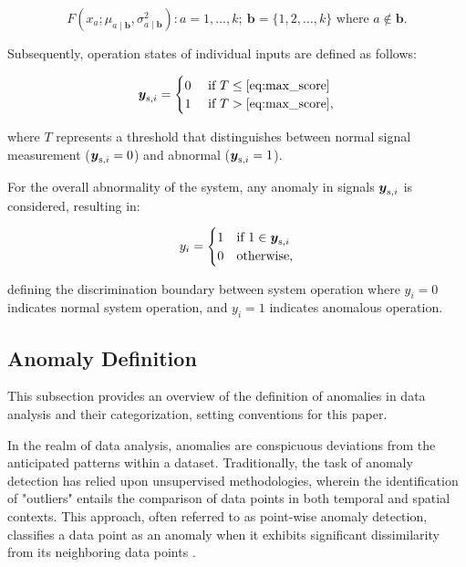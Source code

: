 
\begin{equation}
  {F(x_a; \mu_{a \mid \boldsymbol{b}}, \sigma_{a \mid \boldsymbol{b}}^2)}:a = 1,...,k;~ \boldsymbol{b} = \{1, 2, \ldots, k\} \text{ where }a \notin \boldsymbol{b} \text{.}\label{eq:max_score}
\end{equation}

Subsequently, operation states of individual inputs are defined as follows:

\begin{equation}
  \boldsymbol{y} _{\text{s}, i} =
  \begin{cases}
    0 & \text{ if } T \leq \eqref{eq:max_score}
    \\
    1 & \text{ if } T > \eqref{eq:max_score}
    \text{,}\label{eq:anomaly_signal}
  \end{cases}
\end{equation}

where $T$ represents a threshold that distinguishes between normal signal measurement ($\boldsymbol{y} _{\text{s}, i} = 0$) and abnormal ($\boldsymbol{y} _{\text{s}, i} = 1$).

For the overall abnormality of the system, any anomaly in signals $\boldsymbol{y} _{\text{s}, i}$ is considered, resulting in:

\begin{equation}
  y_i =
  \begin{cases}
    1 & \text{if } 1 \in \boldsymbol{y} _{\text{s}, i}
    \\
    0 & \text{otherwise}
    \text{,}\label{eq:anomaly}
  \end{cases}
\end{equation}


defining the discrimination boundary between system operation where $y_i = 0$ indicates normal system operation, and $y_i = 1$ indicates anomalous operation.

\subsection{Anomaly Definition}\label{AA:AnomalyDefinition}
This subsection provides an overview of the definition of anomalies in data analysis and their categorization, setting conventions for this paper.

In the realm of data analysis, anomalies are conspicuous deviations from the anticipated patterns within a dataset. Traditionally, the task of anomaly detection has relied upon unsupervised methodologies, wherein the identification of "outliers" entails the comparison of data points in both temporal and spatial contexts. This approach, often referred to as point-wise anomaly detection, classifies a data point as an anomaly when it exhibits significant dissimilarity from its neighboring data points \citep{IGLESIASVAZQUEZ2023120994}.

